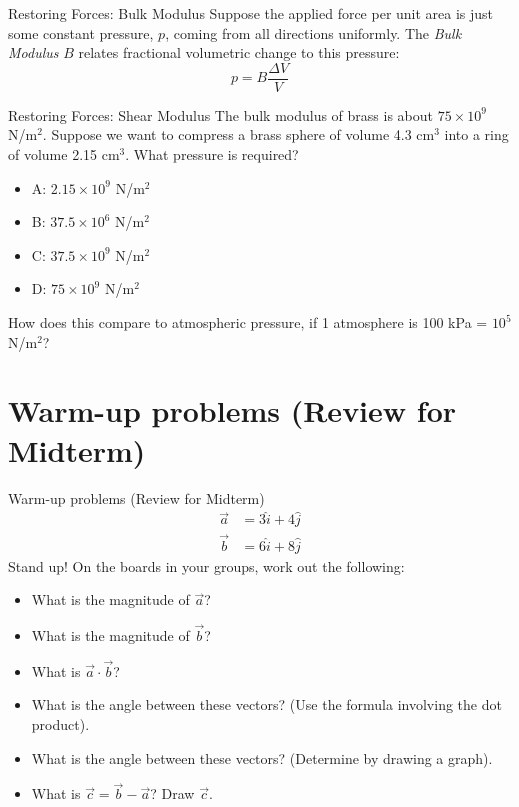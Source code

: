 \documentclass{beamer}
\begin{document}
\begin{frame}{Restoring Forces: Bulk Modulus}
Suppose the applied force per unit area is just some constant pressure, $p$, coming from all directions uniformly.  The \textit{Bulk Modulus} $B$ relates fractional volumetric change to this pressure: \\
\begin{equation}
p = B\frac{\Delta V}{V}
\end{equation}
\end{frame}

\begin{frame}{Restoring Forces: Shear Modulus}
The bulk modulus of brass is about $75 \times 10^{9}$ N/m$^2$.  Suppose we want to compress a brass sphere of volume 4.3 cm$^3$ into a ring of volume 2.15 cm$^3$.  What pressure is required?
\begin{itemize}
\item A: $2.15 \times 10^{9}$ N/m$^2$ 
\item B: $37.5 \times 10^{6}$ N/m$^2$ 
\item C: $37.5 \times 10^{9}$ N/m$^2$ 
\item D: $75 \times 10^{9}$ N/m$^2$ 
\end{itemize}
How does this compare to atmospheric pressure, if 1 atmosphere is 100 kPa = $10^5$ N/m$^2$?
\end{frame}

\section{Warm-up problems (Review for Midterm)}

\begin{frame}{Warm-up problems (Review for Midterm)}
\small
\begin{align}
\vec{a} &= 3\hat{i} + 4\hat{j} \\
\vec{b} &= 6\hat{i} + 8\hat{j}
\end{align}
\alert{Stand up!} On the boards in your groups, work out the following:
\begin{itemize}
\item What is the magnitude of $\vec{a}$?
\item What is the magnitude of $\vec{b}$?
\item What is $\vec{a} \cdot \vec{b}$?
\item What is the angle between these vectors?  (Use the formula involving the dot product).
\item What is the angle between these vectors? (Determine by drawing a graph).
\item What is $\vec{c} = \vec{b}-\vec{a}$?  Draw $\vec{c}$.
\end{itemize}
\end{frame}
\end{document}
